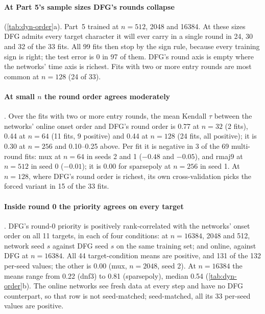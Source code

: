 \paragraph{At Part 5's sample sizes DFG's rounds collapse}  (\cref{tab:dyn-order}a). Part~5 trained at $n=512$, 2048 and 16384. At these sizes DFG admits every target character it will ever carry in a single round in 24, 30 and 32 of the 33 fits. All 99 fits then stop by the sign rule, because every training sign is right; the test error is 0 in 97 of them. DFG's round axis is empty where the networks' time axis is richest. Fits with two or more entry rounds are most common at $n=128$ (24 of 33).

\paragraph{At small $n$ the round order agrees moderately} . Over the fits with two or more entry rounds, the mean Kendall $\tau$ between the networks' online onset order and DFG's round order is 0.77 at $n=32$ (2 fits), 0.44 at $n=64$ (11 fits, 9 positive) and 0.44 at $n=128$ (24 fits, all positive); it is 0.30 at $n=256$ and 0.10--0.25 above. Per fit it is negative in 3 of the 69 multi-round fits: mux at $n=64$ in seeds 2 and 1 ($-0.48$ and $-0.05$), and rmaj9 at $n=512$ in seed 0 ($-0.01$); it is 0.00 for sparsepoly at $n=256$ in seed 1. At $n=128$, where DFG's round order is richest, its own cross-validation picks the forced variant in 15 of the 33 fits.

\paragraph{Inside round 0 the priority agrees on every target} . DFG's round-0 priority is positively rank-correlated with the networks' onset order on all 11 targets, in each of four conditions: at $n=16384$, 2048 and 512, network seed $s$ against DFG seed $s$ on the same training set; and online, against DFG at $n=16384$. All 44 target-condition means are positive, and 131 of the 132 per-seed values; the other is 0.00 (mux, $n=2048$, seed 2). At $n=16384$ the means range from 0.22 (dnf3) to 0.81 (sparsepoly), median 0.54 (\cref{tab:dyn-order}b). The online networks see fresh data at every step and have no DFG counterpart, so that row is not seed-matched; seed-matched, all its 33 per-seed values are positive.

